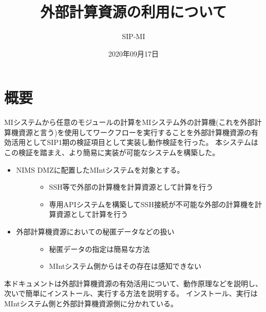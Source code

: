 \documentclass[letterpaper,10pt,dvipdfmx,openany]{sphinxmanual}
\title{外部計算資源の利用について}
\date{2020年09月17日}
\author{SIP-MI}
\begin{document}
\pagestyle{empty}
\sphinxmaketitle
\pagestyle{plain}
\sphinxtableofcontents
\pagestyle{normal}
\label{\detokenize{index::doc}}



\chapter{概要}
\label{\detokenize{using_distributed_properties:id1}}\label{\detokenize{using_distributed_properties::doc}}
MIシステムから任意のモジュールの計算をMIシステム外の計算機(これを外部計算機資源と言う)を使用してワークフローを実行することを外部計算機資源の有効活用としてSIP1期の検証項目として実装し動作検証を行った。
本システムはこの検証を踏まえ、より簡易に実装が可能なシステムを構築した。
\begin{itemize}
\item {} \begin{description}
\item[{NIMS DMZに配置したMIntシステムを対象とする。}] \leavevmode\begin{itemize}
\item {} 
SSH等で外部の計算機を計算資源として計算を行う

\item {} 
専用APIシステムを構築してSSH接続が不可能な外部の計算機を計算資源として計算を行う

\end{itemize}

\end{description}

\item {} \begin{description}
\item[{外部計算機資源においての秘匿データなどの扱い}] \leavevmode\begin{itemize}
\item {} 
秘匿データの指定は簡易な方法

\item {} 
MIntシステム側からはその存在は感知できない

\end{itemize}

\end{description}

\end{itemize}

本ドキュメントは外部計算機資源の有効活用について、動作原理などを説明し、次いで簡単にインストール、実行する方法を説明する。
インストール、実行はMIntシステム側と外部計算機資源側に分かれている。
\end{document}
